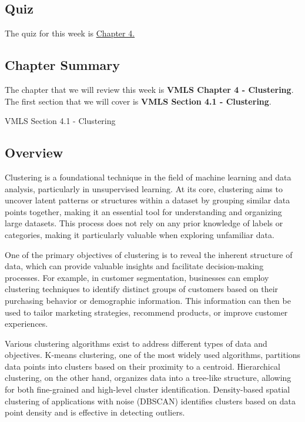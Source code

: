\subsection{Quiz}

The quiz for this week is \href{https://applied.cs.colorado.edu/mod/quiz/view.php?id=50706}{Chapter 4.}  

\subsection{Chapter Summary}

The chapter that we will review this week is \textbf{VMLS Chapter 4 - Clustering}. The first section that we will cover is \textbf{VMLS Section 4.1 - Clustering}.

\begin{notes}{VMLS Section 4.1 - Clustering}
    \subsection*{Overview}

    Clustering is a foundational technique in the field of machine learning and data analysis, particularly in unsupervised learning. At its core, clustering aims to uncover latent patterns or 
    structures within a dataset by grouping similar data points together, making it an essential tool for understanding and organizing large datasets. This process does not rely on any prior 
    knowledge of labels or categories, making it particularly valuable when exploring unfamiliar data.

    One of the primary objectives of clustering is to reveal the inherent structure of data, which can provide valuable insights and facilitate decision-making processes. For example, in customer 
    segmentation, businesses can employ clustering techniques to identify distinct groups of customers based on their purchasing behavior or demographic information. This information can then be 
    used to tailor marketing strategies, recommend products, or improve customer experiences.

    Various clustering algorithms exist to address different types of data and objectives. K-means clustering, one of the most widely used algorithms, partitions data points into clusters based on 
    their proximity to a centroid. Hierarchical clustering, on the other hand, organizes data into a tree-like structure, allowing for both fine-grained and high-level cluster identification. 
    Density-based spatial clustering of applications with noise (DBSCAN) identifies clusters based on data point density and is effective in detecting outliers.


\end{notes}
